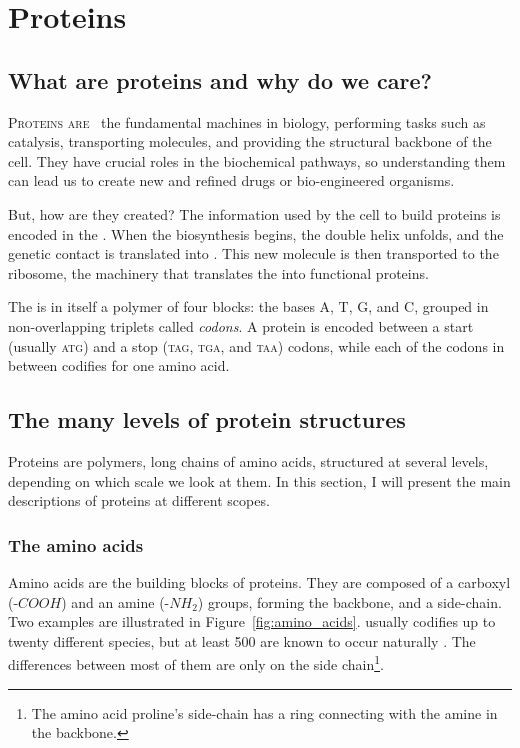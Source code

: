 \chapter{Proteins}
\section[What are proteins?]{What are proteins and why do we care?}
\lettrine[lines=3, lhang=0.25,  nindent=0em, findent=2pt]{\color{Maroon}P}{roteins are\ }
the fundamental machines in biology, performing tasks such as catalysis, transporting molecules, and providing the structural backbone of the cell.
They have crucial roles in the biochemical pathways, so understanding them can lead us to create new and refined drugs or bio-engineered organisms.


But, how are they created?
The information 
used by the cell to build proteins is encoded in the \DNA.
When the biosynthesis begins, the double helix unfolds, and the genetic contact is translated into \RNA{}.
This new molecule is then transported to the ribosome, the machinery that translates the \RNA{} into functional proteins.

The \DNA is in itself a polymer of four blocks: the bases A, T, G, and C,
grouped in non-overlapping triplets called \emph{codons}.
A protein is encoded between a start (usually \textsc{atg}) and a stop (\textsc{tag}, \textsc{tga}, and \textsc{taa}) codons, while each of the codons in between codifies for one amino acid.

\section{The many levels of protein structures}
Proteins are polymers, long chains of amino acids, structured at several levels, depending on which scale we look at them.
In this section, I will present the main descriptions of proteins at different scopes.

\subsection{The amino acids}
Amino acids are the building blocks of proteins.
They are composed of a carboxyl (-$COOH$) and an amine (-$NH_2$) groups, forming the backbone, and a side-chain.
Two examples are illustrated in Figure~\ref{fig:amino_acids}.
\DNA{} usually codifies up to twenty different species, but at least 500 are known to occur naturally \citep{500_amino_acids}.
The differences between most of them are only on the side chain\footnote{The amino acid proline's side-chain has a ring connecting with the amine in the backbone.}.

